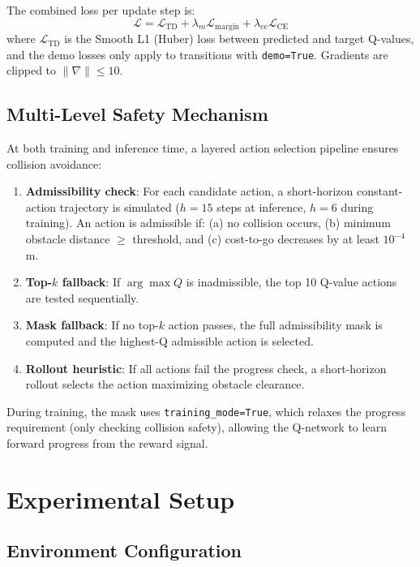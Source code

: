 \documentclass[conference]{IEEEtran}
\begin{document}
The combined loss per update step is:
\begin{equation}
    \mathcal{L} = \mathcal{L}_{\text{TD}} + \lambda_m \mathcal{L}_{\text{margin}} + \lambda_{\text{ce}} \mathcal{L}_{\text{CE}}
    \label{eq:loss}
\end{equation}
where $\mathcal{L}_{\text{TD}}$ is the Smooth L1 (Huber) loss between predicted and target Q-values, and the demo losses only apply to transitions with \texttt{demo=True}.
Gradients are clipped to $\|\nabla\| \leq 10$.

\subsection{Multi-Level Safety Mechanism}\label{sec:safety}

At both training and inference time, a layered action selection pipeline ensures collision avoidance:

\begin{enumerate}
    \item \textbf{Admissibility check}: For each candidate action, a short-horizon constant-action trajectory is simulated ($h=15$ steps at inference, $h=6$ during training). An action is admissible if: (a) no collision occurs, (b) minimum obstacle distance $\geq$ threshold, and (c) cost-to-go decreases by at least $10^{-4}$\,m.
    \item \textbf{Top-$k$ fallback}: If $\arg\max Q$ is inadmissible, the top 10 Q-value actions are tested sequentially.
    \item \textbf{Mask fallback}: If no top-$k$ action passes, the full admissibility mask is computed and the highest-Q admissible action is selected.
    \item \textbf{Rollout heuristic}: If all actions fail the progress check, a short-horizon rollout selects the action maximizing obstacle clearance.
\end{enumerate}

During training, the mask uses \texttt{training\_mode=True}, which relaxes the progress requirement (only checking collision safety), allowing the Q-network to learn forward progress from the reward signal.

\section{Experimental Setup}\label{sec:setup}

\subsection{Environment Configuration}
\end{document}

